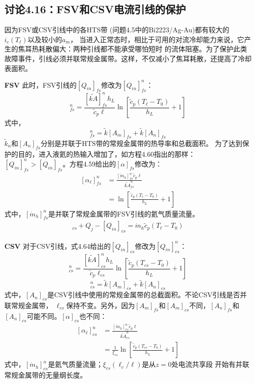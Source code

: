 \subsection{讨论4.16：FSV和CSV电流引线的保护}
因为FSV或CSV引线中的各HTS带 (问题4.5中的Bi2223/Ag-Au)都有较大的$i_c(T_\ell)$以及较小的$a_m$，
当进入正常态时，相比于可用的对流冷却能力来说，它产生的焦耳热耗散偏大：两种引线都不能承受哪怕短时
的流体阻塞。为了保护此类故障事件，引线必须并联常规金属带。这样，不仅减小了焦耳耗散，还提高了冷却表面积。

\textbf{FSV} 此时，FSV引线的$[Q_{in}]_{fs}$修改为$[Q_{in}]_{fs}^{n}$：
\begin{equation}%
[Q_{in}]_{fs}^{n}=\frac{[\tilde{kA}]_{fs}^{n}h_L}{\tilde{c}_p\ell}\ln\left[\frac{\tilde{c}_p(T_\ell-T_0)}{h_L}+1\right]
\end{equation}
式中，
\begin{equation}%
[\tilde{kA}]_{fs}^{n}=\tilde{k}[A_m]_{fs}+\tilde{k}[A_n]_{fs}
\end{equation}
$\tilde{k}_n$和$[A_n]_{fs}$分别是并联于HTS带的常规金属带的热导率和总截面积。
为了达到保护的目的，进入液氦的热输入增加了，如方程4.60指出的那样：$[Q_{in}]_{fs}^{n}>[Q_{in}]_{fs}$。方程4.59给出的$[\alpha]_{fs}$修改为：
\begin{subequations}%
	\begin{align*}
[\alpha_\ell]_{fs}^{n}&=\frac{[\dot{m}_h]_{fs}^{n}\tilde{c}_p\ell}{\tilde{kA}_{fs}^{n}} \\
&=\ln\left[\frac{\tilde{c}_p(T_\ell-T_0)}{h_L}+1\right]
	\end{align*}
\end{subequations}
式中，$[\dot{m}_h]_{fs}^{n}$是并联了常规金属带的FSV引线的氦气质量流量。
\begin{align*}%
[Q_\ell]_{cs}+Q_j-[Q_{in}]_{cs}=\dot{m}_h\tilde{c}_p(T_\ell-T_0) \tag{4.74}
\end{align*}

\textbf{CSV} 对于CSV引线，式4.64给出的$[Q_{in}]_{cs}$修改为$[Q_{in}]_{cs}^{n}$：
\begin{equation}%
[Q_{in}]_{cs}^{n}=\frac{[\tilde{kA}]_{cs}^{n}h_L}{\tilde{c}_p\ell_{cs}}\ln\left[\frac{\tilde{c}_p(T_{cs}-T_0)}{h_L}+1\right]
\end{equation}
\begin{equation}%
[\tilde{kA}]_{cs}^{n}=\tilde{k}[A_m]_{cs}+\tilde{k}[A_n]_{cs}
\end{equation}
式中，$[A_n]_{cs}$是CSV引线中使用的常规金属带的总截面积。不论CSV引线是否并联常规金属带，
$\ell_{cs}$保持不变。另外，因为$[A_m]_{fs}$和$[A_m]_{cs}$不同，$[A_n]_{fs}$和$[A_n]_{cs}$可能不同。$[\alpha]_{cs}$也不同：
\begin{subequations}%
	\begin{align}
[\alpha_\ell]_{cs}^{n}&=\frac{[\dot{m}_h]_{cs}^{n}\tilde{c}_p\ell}{\tilde{kA}_{cs}^{n}} \\
&=\frac{1}{\xi_{cs}}\ln\left[\frac{\tilde{c}_p(T_{cs}-T_0)}{h_L}+1\right]
	\end{align}
\end{subequations}
式中，$[\dot{m}_h]_{cs}^{n}$是氦气质量流量；$\xi_{cs}(\ell_{c}/\ell)$是从$z = 0$处电流共享段
开始有并联常规金属带的无量纲长度。

